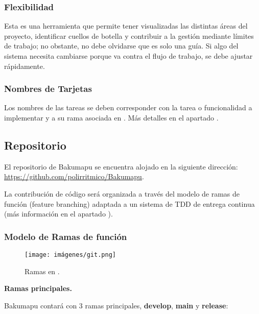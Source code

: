 \subsubsection{Flexibilidad}\label{flujo:flexibilidad}
Esta es una herramienta que permite tener visualizadas las distintas áreas del proyecto, identificar cuellos de botella y contribuir a la gestión mediante límites de trabajo; no obstante, no debe olvidarse que es solo una guía. Si algo del sistema necesita cambiarse porque va contra el flujo de trabajo, se debe ajustar rápidamente.

\subsubsection{Nombres de Tarjetas}\label{flujo:nombres-de-tarjetas}
Los nombres de las tareas se deben corresponder con la tarea o funcionalidad a implementar y a su rama asociada en . Más detalles en el apartado .


\subsection{Repositorio}\label{flujo:repositorio}
El repositorio  de Bakumapu se encuentra alojado en la siguiente dirección: \url{https://github.com/polirritmico/Bakumapu}.

La contribución de código será organizada a través del modelo de ramas de función (feature branching) adaptada a un sistema de TDD de entrega continua (más información en el apartado ).

\subsubsection{Modelo de Ramas de función}\label{flujo:modelo-de-ramas}
\begin{figure}[H]
	\centering
	\texttt{[image: imágenes/git.png]}
	\caption{Ramas en .}
\end{figure}

\noindent\textbf{Ramas principales.}\label{flujo:ramas-principales}

\noindent Bakumapu contará con 3 ramas principales, \textbf{develop}, \textbf{main} y \textbf{release}:

